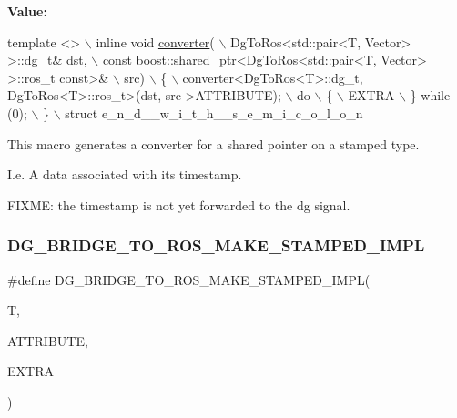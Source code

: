 {\bfseries Value\+:}
\begin{DoxyCode}
\textcolor{keyword}{template} <>                                                               \(\backslash\)
    inline \textcolor{keywordtype}{void} \hyperlink{namespacedynamic__graph_a38ff488b8b21c0b4f4d7f44572fa4ee5}{converter}(                                                    \(\backslash\)
        DgToRos<std::pair<T, Vector> >::dg\_t& dst,                            \(\backslash\)
        \textcolor{keyword}{const} boost::shared\_ptr<DgToRos<std::pair<T, Vector> >::ros\_t \textcolor{keyword}{const}>& \(\backslash\)
            src)                                                              \(\backslash\)
    \{                                                                         \(\backslash\)
        converter<DgToRos<T>::dg\_t, DgToRos<T>::ros\_t>(dst, src->ATTRIBUTE);  \(\backslash\)
        do                                                                    \(\backslash\)
        \{                                                                     \(\backslash\)
            EXTRA                                                             \(\backslash\)
        \} \textcolor{keywordflow}{while} (0);                                                          \(\backslash\)
    \}                                                                         \(\backslash\)
    struct e\_n\_d\_\_w\_i\_t\_h\_\_s\_e\_m\_i\_c\_o\_l\_o\_n
\end{DoxyCode}


This macro generates a converter for a shared pointer on a stamped type. 

I.\+e. A data associated with its timestamp.

F\+I\+X\+ME\+: the timestamp is not yet forwarded to the dg signal. \mbox{\label{converter_8hh_ae02c25236f7cecbfbdbf9cc9239cb785}} 
\subsubsection{\texorpdfstring{D\+G\+\_\+\+B\+R\+I\+D\+G\+E\+\_\+\+T\+O\+\_\+\+R\+O\+S\+\_\+\+M\+A\+K\+E\+\_\+\+S\+T\+A\+M\+P\+E\+D\+\_\+\+I\+M\+PL}{DG\_BRIDGE\_TO\_ROS\_MAKE\_STAMPED\_IMPL}}
{\footnotesize\ttfamily \#define D\+G\+\_\+\+B\+R\+I\+D\+G\+E\+\_\+\+T\+O\+\_\+\+R\+O\+S\+\_\+\+M\+A\+K\+E\+\_\+\+S\+T\+A\+M\+P\+E\+D\+\_\+\+I\+M\+PL(\begin{DoxyParamCaption}\item[{}]{T,  }\item[{}]{A\+T\+T\+R\+I\+B\+U\+TE,  }\item[{}]{E\+X\+T\+RA }\end{DoxyParamCaption})}

